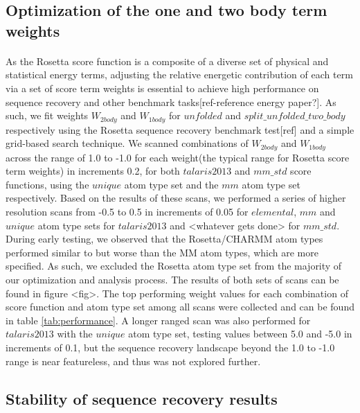 \subsection{Optimization of the one and two body term weights}
\paragraph{}
As the Rosetta score function is a composite of a diverse set of physical and statistical energy terms, adjusting the relative energetic contribution of each term via a set of score term weights is essential to achieve high performance on sequence recovery and other benchmark tasks[ref-reference energy paper?].
As such, we fit weights $W_{2body}$ and $W_{1body}$ for $unfolded$ and $split\_unfolded\_two\_body$ respectively using the Rosetta sequence recovery benchmark test[ref] and a simple grid-based search technique.
We scanned combinations of $W_{2body}$ and $W_{1body}$ across the range of 1.0 to -1.0 for each weight(the typical range for Rosetta score term weights) in increments 0.2, for both $talaris2013$ and $mm\_std$ score functions, using the $unique$ atom type set and the $mm$ atom type set respectively.
Based on the results of these scans, we performed a series of higher resolution scans from -0.5 to 0.5 in increments of 0.05 for $elemental$, $mm$ and $unique$ atom type sets for $talaris2013$ and <whatever gets done> for $mm\_std$.
During early testing, we observed that the Rosetta/CHARMM atom types performed similar to but worse than the MM atom types, which are more specified.
As such, we excluded the Rosetta atom type set from the majority of our optimization and analysis process.
The results of both sets of scans can be found in figure <fig>.
The top performing weight values for each combination of score function and atom type set among all scans were collected and can be found in table \ref{tab:performance}.
A longer ranged scan was also performed for $talaris2013$ with the $unique$ atom type set, testing values between 5.0 and -5.0 in increments of 0.1, but the sequence recovery landscape beyond the 1.0 to -1.0 range is near featureless, and thus was not explored further.

\subsection{Stability of sequence recovery results}
